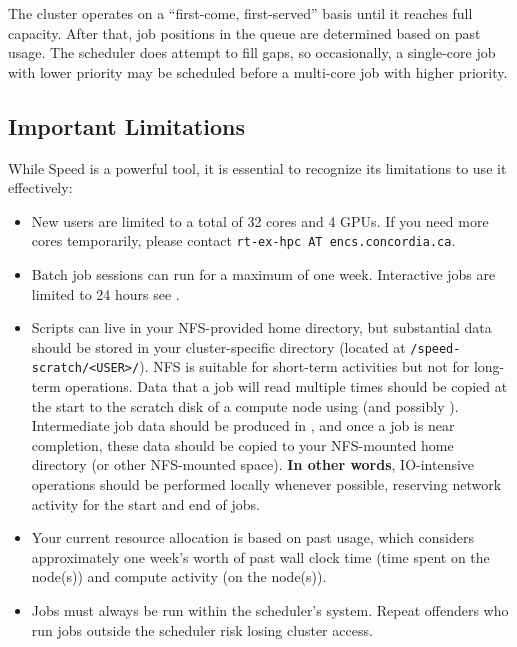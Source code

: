 
The cluster operates on a ``first-come, first-served'' basis until it reaches full capacity.
After that, job positions in the queue are determined based on past usage.
The scheduler does attempt to fill gaps, so occasionally, a single-core job with lower priority
may be scheduled before a multi-core job with higher priority.

\subsection{Important Limitations}
\label{sect:limitations}

While Speed is a powerful tool, it is essential to recognize its limitations to use it effectively:

\begin{itemize}
	\item New users are limited to a total of 32 cores and 4 GPUs. If you need more cores temporarily,
	please contact \texttt{rt-ex-hpc AT encs.concordia.ca}.

	\item Batch job sessions can run for a maximum of one week.
	Interactive jobs are limited to 24 hours see .

	\item Scripts can live in your NFS-provided home directory, but substantial data should be stored in
    your cluster-specific directory (located at \verb+/speed-scratch/<USER>/+).
    NFS is suitable for short-term activities but not for long-term operations.
	Data that a job will read multiple times should be copied at the start to the scratch disk of a compute node using
	 (and possibly ).
	Intermediate job data should be produced in , and once a job is near completion,
	these data should be copied to your NFS-mounted home directory (or other NFS-mounted space).
	\textbf{In other words}, IO-intensive operations should be performed locally whenever possible,
	reserving network activity for the start and end of jobs.

	\item Your current resource allocation is based on past usage, which considers approximately
    one week's worth of past wall clock time (time spent on the node(s)) and compute activity (on the node(s)).

	\item Jobs must always be run within the scheduler's system. Repeat offenders who
	run jobs outside the scheduler risk losing cluster access.
\end{itemize}

